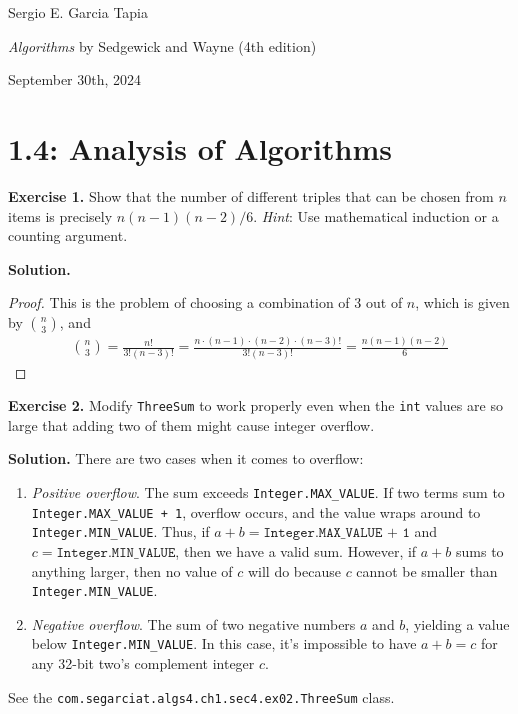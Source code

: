 \documentclass[12pt, a4paper]{article}
\newenvironment{ex}[2][Exercise]
{\par\medskip\noindent \textbf{#1 #2.}}
{\medskip}
\newenvironment{sol}[1][Solution]
{\par\medskip\noindent \textbf{#1.} }
{\medskip}
\begin{document}
	\noindent Sergio E. Garcia Tapia \hfill
	
	\noindent \emph{Algorithms} by Sedgewick and Wayne (4th edition) \cite{sedgewick_wayne}\hfill
	
	\noindent September 30th, 2024\hfill 
	\section*{1.4: Analysis of Algorithms}
	\begin{ex}{1}
		Show that the number of different triples that can be chosen from $n$ items is
		precisely $n(n-1)(n-2)/6$. \emph{Hint}: Use mathematical induction  or a counting argument.
	\end{ex}
	\begin{sol}
		\begin{proof}
			This is the problem of choosing a combination of $3$ out of $n$, which is given
			by $\binom{n}{3}$, and
			\begin{align*}
				\binom{n}{3} = \frac{n!}{3!(n-3)!}=\frac{n\cdot (n-1)\cdot (n-2)\cdot (n-3)!}{3!(n-3)!}  = \frac{n(n-1)(n-2)}{6}
			\end{align*}
		\end{proof}
	\end{sol}
	\begin{ex}{2}
		Modify \texttt{ThreeSum} to work properly even when the \texttt{int} values are so
		large that adding two of them might cause integer overflow.
	\end{ex}
	\begin{sol}
		There are two cases when it comes to overflow:
		\begin{enumerate}[label=(\roman*)]
			\item \emph{Positive overflow}. The sum exceeds \texttt{Integer.MAX\_VALUE}.
			If two terms sum to \texttt{Integer.MAX\_VALUE + 1}, overflow occurs, and
			the value wraps around to \texttt{Integer.MIN\_VALUE}. Thus, if
			$a + b = \texttt{Integer.MAX\_VALUE + 1}$ and $c = \texttt{Integer.MIN\_VALUE}$,
			then we have a valid sum. However, if $a+b$ sums to anything larger, then
			no value of $c$ will do because $c$ cannot be smaller than \texttt{Integer.MIN\_VALUE}.
			\item \emph{Negative overflow}. The sum of two negative numbers $a$ and $b$, yielding
			a value below \texttt{Integer.MIN\_VALUE}. In this case, it's impossible to have
			$a + b = c$ for any 32-bit two's complement integer $c$.
		\end{enumerate}
		See the \texttt{com.segarciat.algs4.ch1.sec4.ex02.ThreeSum} class.
	\end{sol}
\end{document}
